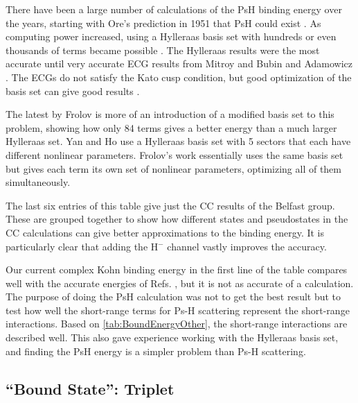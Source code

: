 \documentclass[Dissertation.tex]{subfiles}
\begin{document}

There have been a large number of calculations of the PsH binding energy over the years, starting with Ore's prediction in 1951 that PsH could exist \cite{Ore1951}. As computing power increased, using a Hylleraas basis set with hundreds or even thousands of terms became possible \cite{Ho1978,Ho1986,Yan1999,VanReeth2003}. The Hylleraas results were the most accurate until very accurate ECG results from Mitroy \cite{Mitroy2006} and Bubin and Adamowicz \cite{Bubin2004,Bubin2006}. The ECGs do not satisfy the Kato cusp condition, but good optimization of the basis set can give good results \cite{Mitroy2013}.

The latest by Frolov \cite{Frolov2010} is more of an introduction of a modified basis set to this problem, showing how only 84 terms gives a better energy than a much larger Hylleraas set. Yan and Ho \cite{Yan1999} use a Hylleraas basis set with 5 sectors that each have different nonlinear parameters. Frolov's work essentially uses the same basis set but gives each term its own set of nonlinear parameters, optimizing all of them simultaneously.

The last six entries of this table give just the CC results of the Belfast group. These are grouped together to show how different states and pseudostates in the CC calculations can give better approximations to the binding energy. It is particularly clear that adding the H$^-$ channel vastly improves the accuracy.

Our current complex Kohn binding energy in the first line of the table compares well with the accurate energies of Refs. \cite{Bubin2006, Mitroy2006, Yan1999}, but it is not as accurate of a calculation. The purpose of doing the PsH calculation was not to get the best result but to test how well the short-range terms for Ps-H scattering represent the short-range interactions. Based on \cref{tab:BoundEnergyOther}, the short-range interactions are described well. This also gave experience working with the Hylleraas basis set, and finding the PsH energy is a simpler problem than Ps-H scattering.

\subsection{``Bound State'': Triplet}
\end{document}

